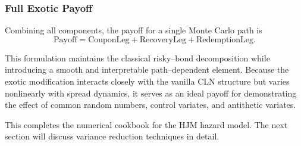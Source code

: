 \subsubsection*{Full Exotic Payoff}

Combining all components, the payoff for a single Monte Carlo path is
\[
\text{Payoff}
= \text{CouponLeg}
+ \text{RecoveryLeg}
+ \text{RedemptionLeg}.
\]

This formulation maintains the classical risky--bond decomposition while
introducing a smooth and interpretable path--dependent element. Because the
exotic modification interacts closely with the vanilla CLN structure but varies
nonlinearly with spread dynamics, it serves as an ideal payoff for demonstrating
the effect of common random numbers, control variates, and antithetic variates.

This completes the numerical cookbook for the HJM hazard model. The next section will discuss variance reduction 
techniques in detail. 
